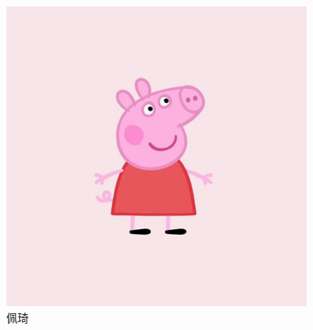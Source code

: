 \begin{figure}[htbp]
  \centering
  \includegraphics[width=10cm]{img/peppa.jpg}
  \caption{佩琦}
  \label{fig:single}
\end{figure}
